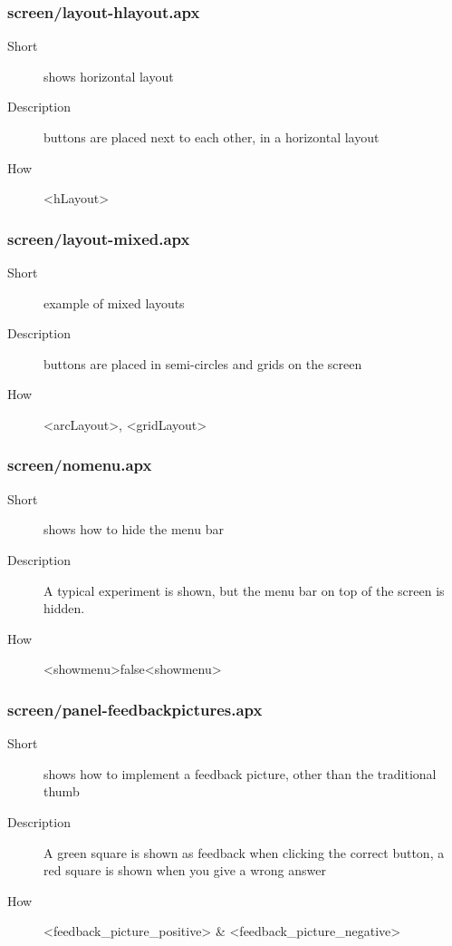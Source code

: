 \subsubsection{screen/layout-hlayout.apx}
\begin{description}
\item[Short] 
 shows horizontal layout
\item[Description] 
 buttons are placed next to each other, in a horizontal layout
\item[How] 
 \textless{}hLayout\textgreater{}
\end{description}

\subsubsection{screen/layout-mixed.apx}
\begin{description}
\item[Short] 
 example of mixed layouts
\item[Description] 
 buttons are placed in semi-circles and grids on the screen
\item[How] 
 \textless{}arcLayout\textgreater{}, \textless{}gridLayout\textgreater{}
\end{description}

\subsubsection{screen/nomenu.apx}
\begin{description}
\item[Short] 
 shows how to hide the menu bar
\item[Description] 
 A typical experiment is shown, but the menu bar on top of the screen is hidden.
\item[How] 
 \textless{}showmenu\textgreater{}false\textless{}showmenu\textgreater{}
\end{description}

\subsubsection{screen/panel-feedbackpictures.apx}
\begin{description}
\item[Short] 
 shows how to implement a feedback picture, other than the traditional thumb
\item[Description] 
 A green square is shown as feedback when clicking the correct button, a red square is shown when you give a wrong answer
\item[How] 
 \textless{}feedback\_picture\_positive\textgreater{} \& \textless{}feedback\_picture\_negative\textgreater{}
\end{description}

